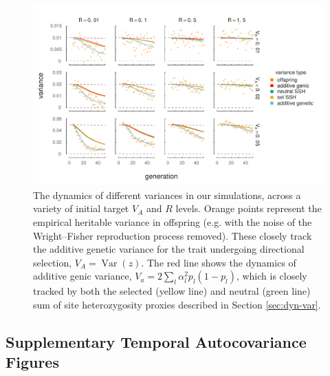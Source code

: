 \documentclass[11pt]{article}
\DeclareMathOperator{\var}{Var}
\begin{document}
\begin{figure}[!ht]
  \centering
  \includegraphics{./images/expfit-vark-types.pdf}

  \caption{The dynamics of different variances in our simulations, across a
    variety of initial target $V_A$ and $R$ levels. Orange points represent the
    empirical heritable variance in offspring (e.g. with the noise of the
    Wright--Fisher reproduction process removed). These closely track the
    additive genetic variance for the trait undergoing directional selection,
    $V_A = \var(z)$. The red line shows the dynamics of additive genic
    variance, $V_a = 2 \sum_l \alpha_l^2 p_l(1-p_l)$, which is closely tracked
  by both the selected (yellow line) and neutral (green line) sum of site
heterozygosity proxies described in Section \ref{sec:dyn-var}.}

  \label{fig:multilocus-expfit-vark}
\end{figure}

\clearpage
\newpage

\subsection{Supplementary Temporal Autocovariance Figures}
\end{document}
